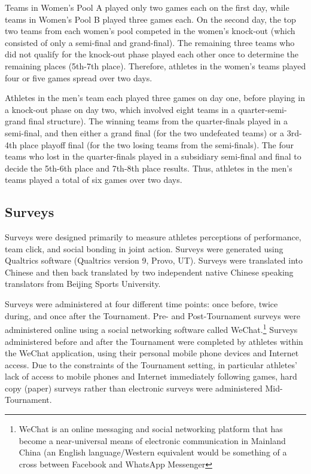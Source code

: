 \begin{CJK}{UTF8}{gbsn}
Teams in Women's Pool A played only two games each on the first day, while teams in Women's Pool B played three games each. On the second day, the top two teams from each women's pool competed in the women's knock-out (which consisted of only a semi-final and grand-final).  The remaining three teams who did not qualify for the knock-out phase played each other once to determine the remaining places (5th-7th place).  Therefore, athletes in the women's teams played four or five games spread over two days.

Athletes in the men's team each played three games on day one, before playing in a knock-out phase on day two, which involved eight teams in a quarter-semi-grand final structure). The winning teams from the quarter-finals played in a semi-final, and then either a grand final (for the two undefeated teams) or a 3rd-4th place playoff final (for the two losing teams from the semi-finals). The four teams who lost in the quarter-finals played in a subsidiary semi-final and final to decide the 5th-6th place and 7th-8th place results. Thus, athletes in the men's teams played a total of six games over two days.




\subsection{Surveys}
Surveys were designed primarily to measure athletes perceptions of performance, team click, and social bonding in joint action.  Surveys were generated using Qualtrics software (Qualtrics version 9, Provo, UT). Surveys were translated into Chinese and then back translated by two independent native Chinese speaking translators from Beijing Sports University.

Surveys were administered at four different time points: once before, twice during, and once after the Tournament.  Pre- and Post-Tournament surveys were administered online using a social networking software called WeChat.\footnote{WeChat is an online messaging and social networking platform that has become a near-universal means of electronic communication in Mainland China (an English language/Western equivalent would be something of a cross between Facebook and WhatsApp Messenger} Surveys administered before and after the Tournament were completed by athletes within the WeChat application, using their personal mobile phone devices and Internet access.  Due to the constraints of the Tournament setting, in particular athletes' lack of access to mobile phones and Internet immediately following games, hard copy (paper) surveys rather than electronic surveys were administered Mid-Tournament.



\end{CJK}
